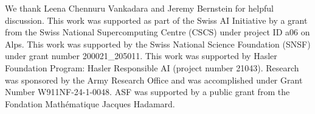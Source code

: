 We thank Leena Chennuru Vankadara and Jeremy Bernstein for helpful discussion. 
This work was supported as part of the Swiss AI Initiative by a grant from the Swiss National Supercomputing Centre (CSCS) under project ID a06 on Alps.
This work was supported by the Swiss National Science Foundation (SNSF) under grant number 200021\_205011. 
This work was supported by Hasler Foundation Program: Hasler Responsible AI (project number 21043).
Research was sponsored by the Army Research Office and was accomplished under Grant Number W911NF-24-1-0048.
ASF was supported by a public grant from the Fondation Mathématique Jacques Hadamard.